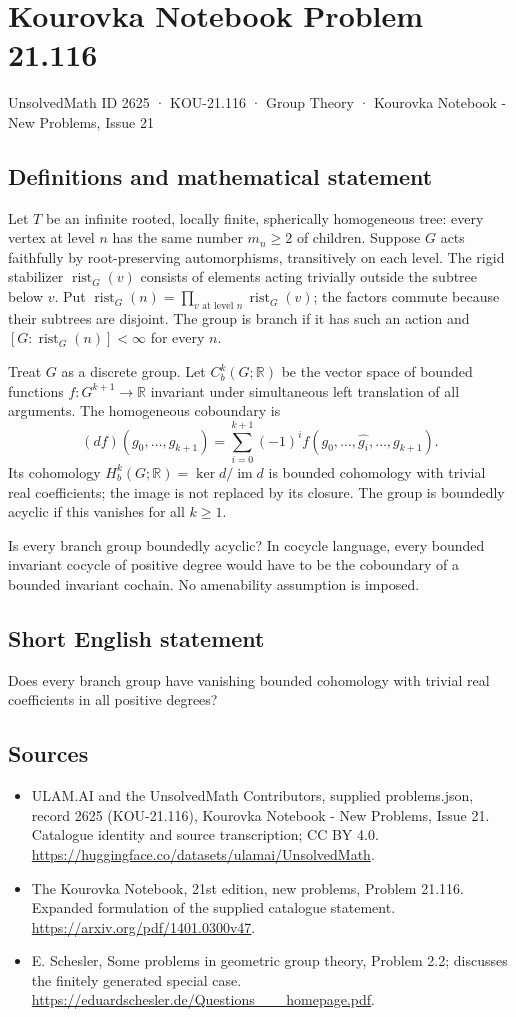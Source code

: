 \documentclass[11pt,a4paper]{article}
\begin{document}
\section*{Kourovka Notebook Problem 21.116}\label{2625}
{\small UnsolvedMath ID 2625 · KOU-21.116 · Group Theory · Kourovka Notebook - New Problems, Issue 21}
\subsection{Definitions and mathematical statement}
Let $T$ be an infinite rooted, locally finite, spherically homogeneous tree:
every vertex at level $n$ has the same number $m_n\geq2$ of children.
Suppose $G$ acts faithfully by root-preserving automorphisms, transitively on
each level. The rigid stabilizer $\operatorname{rist}_G(v)$ consists of elements
acting trivially outside the subtree below $v$. Put
$\operatorname{rist}_G(n)=\prod_{v\text{ at level }n}\operatorname{rist}_G(v)$;
the factors commute because their subtrees are disjoint.
The group is branch if it has such an action and
$[G:\operatorname{rist}_G(n)]<\infty$ for every $n$.

Treat $G$ as a discrete group. Let $C_b^k(G;\mathbb R)$ be the vector space
of bounded functions $f:G^{k+1}\to\mathbb R$ invariant under simultaneous
left translation of all arguments. The homogeneous coboundary is
\[
(df)(g_0,\ldots,g_{k+1})=
\sum_{i=0}^{k+1}(-1)^i f(g_0,\ldots,\widehat{g_i},\ldots,g_{k+1}).
\]
Its cohomology $H_b^k(G;\mathbb R)=\ker d/\operatorname{im}d$ is bounded
cohomology with trivial real coefficients; the image is not replaced by its
closure. The group is boundedly acyclic if this vanishes for all $k\geq1$.

Is every branch group boundedly acyclic? In cocycle language, every bounded
invariant cocycle of positive degree would have to be the coboundary of a
bounded invariant cochain. No amenability assumption is imposed.
\subsection{Short English statement}
Does every branch group have vanishing bounded cohomology with trivial real coefficients in all positive degrees?
\subsection{Sources}
\begin{itemize}
\item[S1] ULAM.AI and the UnsolvedMath Contributors, supplied problems.json, record 2625 (KOU-21.116), Kourovka Notebook - New Problems, Issue 21. Catalogue identity and source transcription; CC BY 4.0.
\url{https://huggingface.co/datasets/ulamai/UnsolvedMath}.
\item[S2] The Kourovka Notebook, 21st edition, new problems, Problem 21.116. Expanded formulation of the supplied catalogue statement.
\url{https://arxiv.org/pdf/1401.0300v47}.
\item[S3] E. Schesler, Some problems in geometric group theory, Problem 2.2; discusses the finitely generated special case.
\url{https://eduardschesler.de/Questions___homepage.pdf}.
\end{itemize}
\end{document}
